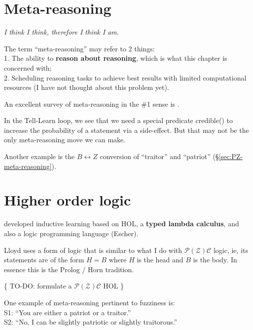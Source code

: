 
\section{Meta-reasoning}
\begin{flushright}
\emph{I think I think, therefore I think I am.}
\end{flushright}

The term ``meta-reasoning'' may refer to 2 things:\\
1. The ability to \textbf{reason about reasoning}, which is what this chapter is concerned with;\\
2. Scheduling reasoning tasks to achieve best results with limited computational resources (I have not thought about this problem yet).

An excellent survey of meta-reasoning in the \#1 sense is \citep*{Constantini2002}.

In the Tell-Learn loop, we see that we need a special predicate credible() to increase the probability of a statement via a side-effect.  But that may not be the only meta-reasoning move we can make.

Another example is the $B \leftrightarrow Z$ conversion of ``traitor'' and ``patriot'' (\S\ref{sec:PZ-meta-reasoning}).

\section{Higher order logic}
\label{sec:HOL}

\citep*{Lloyd2003} developed inductive learning based on HOL, a \textbf{typed lambda calculus}, and also a logic programming language (Escher).

Lloyd uses a form of logic that is similar to what I do with $\mathcal{P(Z)C}$ logic, ie, its statements are of the form $H = B$ where $H$ is the head and $B$ is the body.  In essence this is the Prolog / Horn tradition.

\{ TO-DO:  formulate a $\mathcal{P(Z)C}$ HOL \}

\label{sec:PZ-meta-reasoning}

One example of meta-reasoning pertinent to fuzziness is:\\
\hspace*{1cm} S1: ``You are either a patriot or a traitor.''\\
\hspace*{1cm} S2: ``No, I can be slightly patriotic or slightly traitorous.''

